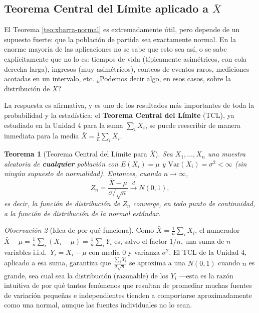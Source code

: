 \documentclass[11pt,a4paper]{article}
\theoremstyle{plain}
\newtheorem{teorema}{Teorema}[section]
\theoremstyle{definition}
\theoremstyle{remark}
\newtheorem{observacion}[teorema]{Observación}
\begin{document}
\subsection{Teorema Central del Límite aplicado a $\bar X$}
\label{sec:tcl}

El Teorema \ref{teo:xbarra-normal} es extremadamente útil, pero depende de un supuesto fuerte: que la población de partida sea exactamente normal. En la enorme mayoría de las aplicaciones no se sabe que esto sea así, o se sabe explícitamente que no lo es: tiempos de vida (típicamente asimétricos, con cola derecha larga), ingresos (muy asimétricos), conteos de eventos raros, mediciones acotadas en un intervalo, etc. ¿Podemos decir algo, en esos casos, sobre la distribución de $\bar X$?

La respuesta es afirmativa, y es uno de los resultados más importantes de toda la probabilidad y la estadística: el \textbf{Teorema Central del Límite} (TCL), ya estudiado en la Unidad 4 para la suma $\sum_i X_i$, se puede reescribir de manera inmediata para la media $\bar X = \frac1n\sum_i X_i$.

\begin{teorema}[Teorema Central del Límite para $\bar X$]
Sea $X_1,\dots,X_n$ una muestra aleatoria de \textbf{cualquier} población con $E(X_i)=\mu$ y $\mathrm{Var}(X_i)=\sigma^2<\infty$ (sin ningún supuesto de normalidad). Entonces, cuando $n\to\infty$,
$$Z_n = \frac{\bar X-\mu}{\sigma/\sqrt n} \xrightarrow{\ d\ } N(0,1),$$
es decir, la función de distribución de $Z_n$ converge, en todo punto de continuidad, a la función de distribución de la normal estándar.
\end{teorema}

\begin{observacion}[Idea de por qué funciona]
Como $\bar X = \frac1n\sum_i X_i$, el numerador $\bar X - \mu = \frac1n\sum_i (X_i-\mu) = \frac1n\sum_i Y_i$ es, salvo el factor $1/n$, una suma de $n$ variables i.i.d.\ $Y_i = X_i - \mu$ con media $0$ y varianza $\sigma^2$. El TCL de la Unidad 4, aplicado a esa suma, garantiza que $\frac{\sum_i Y_i}{\sigma\sqrt n}$ se aproxima a una $N(0,1)$ cuando $n$ es grande, sea cual sea la distribución (razonable) de los $Y_i$ —esta es la razón intuitiva de por qué tantos fenómenos que resultan de promediar muchas fuentes de variación pequeñas e independientes tienden a comportarse aproximadamente como una normal, aunque las fuentes individuales no lo sean.
\end{observacion}
\end{document}
